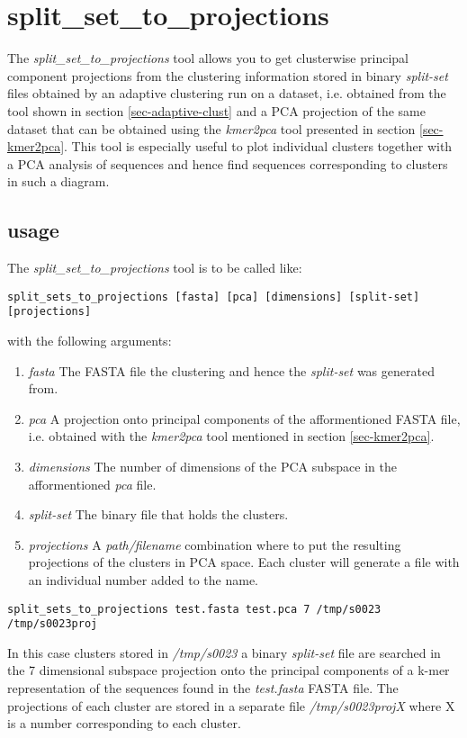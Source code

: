 \section{split\_set\_to\_projections} \label{sec-ssproj}

The \emph{split\_set\_to\_projections} tool allows you to get clusterwise
principal component projections from the clustering information stored in
binary \emph{split-set} files obtained by an adaptive clustering run
on a dataset, i.e. obtained from the tool shown in section
\ref{sec-adaptive-clust} and a PCA projection of the same dataset that
can be obtained using the \emph{kmer2pca} tool presented in section
\ref{sec-kmer2pca}.
This tool is especially useful to plot individual clusters together
with a PCA analysis of sequences and hence find sequences
corresponding to clusters in such a diagram. 

\subsection{usage}

The \emph{split\_set\_to\_projections} tool is to be called like:

\begin{lstlisting}
split_sets_to_projections [fasta] [pca] [dimensions] [split-set] [projections]
\end{lstlisting}
with the following arguments:
\begin{enumerate}
  \item \emph{fasta} The FASTA file the clustering and hence the
    \emph{split-set} was generated from.
  \item \emph{pca} A projection onto principal components of the
    afformentioned FASTA file, i.e. obtained with the \emph{kmer2pca}
    tool mentioned in section \ref{sec-kmer2pca}.
  \item \emph{dimensions} The number of dimensions of the PCA subspace in the
    afformentioned \emph{pca} file.
  \item \emph{split-set} The binary file that holds the clusters.
  \item \emph{projections} A \emph{path/filename} combination where to put
    the resulting projections of the clusters in PCA space. Each
    cluster will generate a file with an individual number added to
    the name.
\end{enumerate}

\begin{lstlisting}
split_sets_to_projections test.fasta test.pca 7 /tmp/s0023 /tmp/s0023proj
\end{lstlisting}
In this case clusters stored in \emph{/tmp/s0023} a binary
\emph{split-set} file are searched in the 7 dimensional subspace
projection onto the principal components of a k-mer representation of
the sequences found in the \emph{test.fasta} FASTA file. The
projections of each cluster are stored in a separate file
\emph{/tmp/s0023projX} where X is a number corresponding to each
cluster. 
